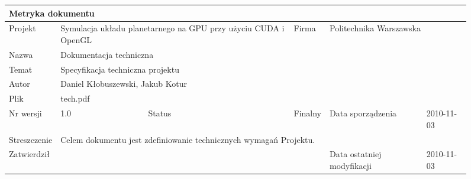 \begin{figure}[h]
	\centering
\begin{tabular}{|p{}|p{}|p{}|p{}|p{}|p{}|p{}|}
	\hline
	\multicolumn{7}{|l|}{Metryka dokumentu} \\
	\hline
	Projekt & \multicolumn{2}{p{.34\textwidth}|}{Symulacja układu planetarnego na GPU przy użyciu CUDA i OpenGL} &
	Firma & \multicolumn{3}{l|}{Politechnika Warszawska} \\
	\hline
	Nazwa & \multicolumn{6}{l|}{Dokumentacja techniczna} \\
	\hline
	Temat & \multicolumn{6}{l|}{Specyfikacja techniczna projektu} \\
	\hline
	Autor & \multicolumn{6}{l|}{Daniel Kłobuszewski, Jakub Kotur} \\
	\hline
	Plik & \multicolumn{6}{l|}{tech.pdf} \\
	\hline
	Nr wersji & 1.0 & Status & Finalny & \multicolumn{2}{l|}{Data sporządzenia} & 2010-11-03 \\
	\hline
	Streszczenie & \multicolumn{6}{p{11cm}|}{Celem dokumentu jest zdefiniowanie
		technicznych wymagań Projektu.} \\
	\hline
	Zatwierdził & \multicolumn{3}{l|}{ } &
	\multicolumn{2}{l|}{Data ostatniej modyfikacji} & 2010-11-03 \\
	\hline
\end{tabular}

	\label{tab:metric}
\end{figure}


